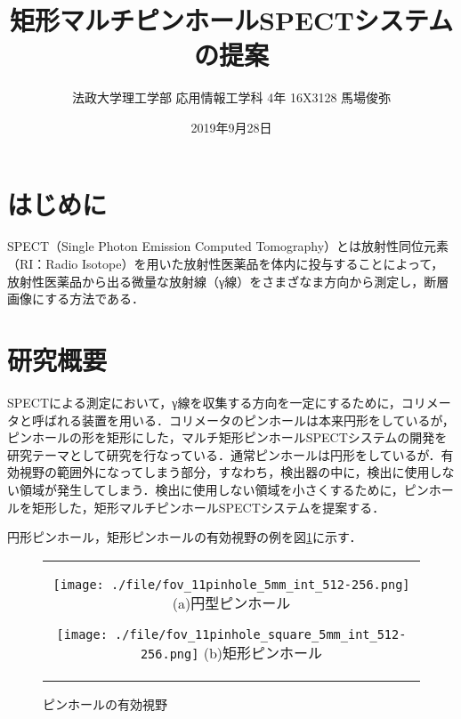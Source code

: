\documentclass[dvipdfmx,autodetect-engine,twocolumn,10pt]{jsarticle}%
\title{矩形マルチピンホールSPECTシステムの提案}
\author{法政大学理工学部 応用情報工学科 4年 16X3128 馬場俊弥}
\date{2019年9月28日}
\begin{document}
\maketitle
\section{はじめに}
SPECT（Single Photon Emission Computed Tomography）とは放射性同位元素（RI：Radio Isotope）を用いた放射性医薬品を体内に投与することによって，放射性医薬品から出る微量な放射線（γ線）をさまざなま方向から測定し，断層画像にする方法である．
%



\section{研究概要}
SPECTによる測定において，γ線を収集する方向を一定にするために，コリメータと呼ばれる装置を用いる．コリメータのピンホールは本来円形をしているが，ピンホールの形を矩形にした，マルチ矩形ピンホールSPECTシステムの開発を研究テーマとして研究を行なっている．通常ピンホールは円形をしているが．有効視野の範囲外になってしまう部分，すなわち，検出器の中に，検出に使用しない領域が発生してしまう．検出に使用しない領域を小さくするために，ピンホールを矩形した，矩形マルチピンホールSPECTシステムを提案する．

円形ピンホール，矩形ピンホールの有効視野の例を図\ref{fov}に示す．
\begin{figure}[htbp]
  \begin{center}
    \begin{tabular}{c}

      \begin{minipage}{0.5\hsize}
        \begin{center}
          \texttt{[image: ./file/fov\_11pinhole\_5mm\_int\_512-256.png]}
          \hspace{1cm} \small{(a)円型ピンホール}
        \end{center}
      \end{minipage}

      \begin{minipage}{0.5\hsize}
        \begin{center}
          \texttt{[image: ./file/fov\_11pinhole\_square\_5mm\_int\_512-256.png]}
          \hspace{1.6cm} \small{(b)矩形ピンホール}
        \end{center}
      \end{minipage}

    \end{tabular}
  \caption{ピンホールの有効視野}
  \label{fov}
  \end{center}
\end{figure}
\end{document}
